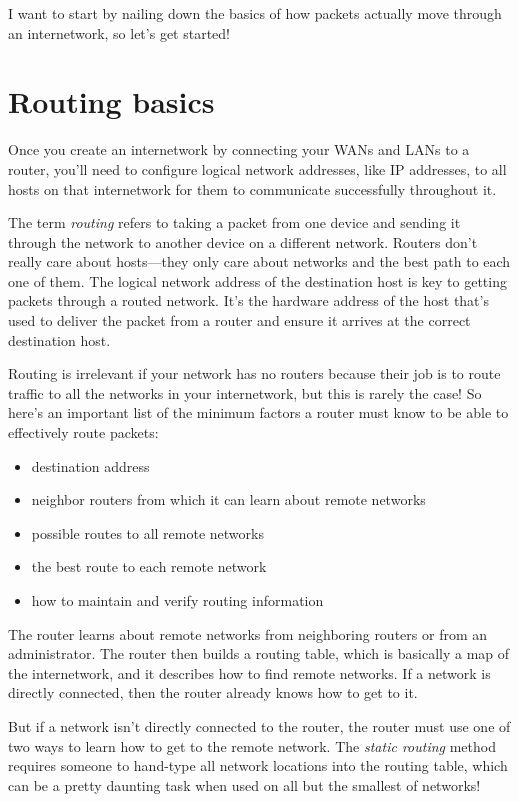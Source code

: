 I want to start by nailing down the basics of how packets actually move through an internetwork, so let's get started!



\section{Routing basics}

Once you create an internetwork by connecting your WANs and LANs to a
router, you'll need to configure logical network addresses, like IP
addresses, to all hosts on that internetwork for them to communicate
successfully throughout it.

The term \emph{routing} refers to taking a packet from one device and
sending it through the network to another device on a different network.
Routers don't really care about hosts---they only care about networks
and the best path to each one of them. The logical network address of
the destination host is key to getting packets through a routed network.
It's the hardware address of the host that's used to deliver the packet
from a router and ensure it arrives at the correct destination host.

Routing is irrelevant if your network has no routers because their job
is to route traffic to all the networks in your internetwork, but this
is rarely the case! So here's an important list of the minimum factors a
router must know to be able to effectively route packets:

\begin{itemize}
\item destination address
\item neighbor routers from which it can learn about remote networks
\item possible routes to all remote networks
\item the best route to each remote network
\item how to maintain and verify routing information
\end{itemize}

The router learns about remote networks from neighboring routers or from
an administrator. The router then builds a routing table, which is
basically a map of the internetwork, and it describes how to find remote
networks. If a network is directly connected, then the router already
knows how to get to it.

But if a network isn't directly connected to the router, the router must
use one of two ways to learn how to get to the remote network. The
\emph{static routing} method requires someone to hand-type all network
locations into the routing table, which can be a pretty daunting task
when used on all but the smallest of networks!

